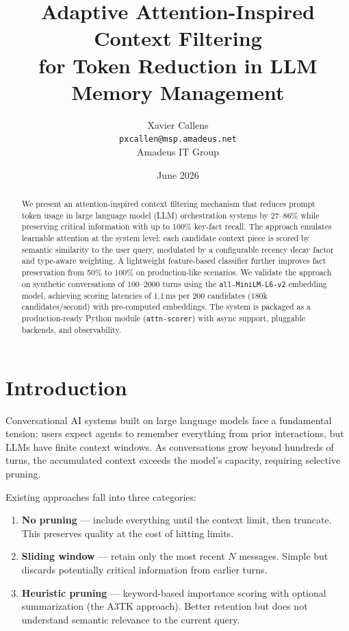 \documentclass[11pt,a4paper]{article}
\title{Adaptive Attention-Inspired Context Filtering\\for Token Reduction in LLM Memory Management}
\author{Xavier Callens\\
\texttt{pxcallen@msp.amadeus.net}\\
Amadeus IT Group}
\date{June 2026}
\begin{document}
\maketitle

\begin{abstract}
We present an attention-inspired context filtering mechanism that reduces prompt
token usage in large language model (LLM) orchestration systems by 27--86\% while
preserving critical information with up to 100\% key-fact recall. The approach
emulates learnable attention at the system level: each candidate context piece
is scored by semantic similarity to the user query, modulated by a configurable
recency decay factor and type-aware weighting. A lightweight feature-based
classifier further improves fact preservation from 50\% to 100\% on production-like
scenarios. We validate the approach on synthetic conversations of 100--2000 turns
using the \texttt{all-MiniLM-L6-v2} embedding model, achieving scoring latencies
of 1.1\,ms per 200 candidates (180k candidates/second) with pre-computed embeddings.
The system is packaged as a production-ready Python module (\texttt{attn-scorer})
with async support, pluggable backends, and observability.
\end{abstract}

\tableofcontents
\newpage

\section{Introduction}
\label{sec:intro}

Conversational AI systems built on large language models face a fundamental
tension: users expect agents to remember everything from prior interactions,
but LLMs have finite context windows. As conversations grow beyond hundreds of
turns, the accumulated context exceeds the model's capacity, requiring selective
pruning.

Existing approaches fall into three categories:
\begin{enumerate}
    \item \textbf{No pruning} --- include everything until the context limit,
    then truncate. This preserves quality at the cost of hitting limits.
    \item \textbf{Sliding window} --- retain only the most recent $N$ messages.
    Simple but discards potentially critical information from earlier turns.
    \item \textbf{Heuristic pruning} --- keyword-based importance scoring with
    optional summarization (the A3TK approach). Better retention but does not
    understand semantic relevance to the current query.
\end{enumerate}
\end{document}

